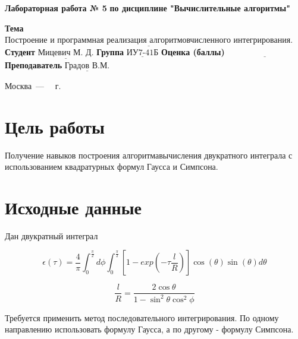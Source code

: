 \documentclass[a4paper,12pt]{article}
\begin{document}
\begin{center}
	\noindent\begin{minipage}{1.3\textwidth}\centering
	\Large\textbf{  Лабораторная работа № 5}\newline
	\textbf{по дисциплине "Вычислительные алгоритмы"}\newline\newline\newline
	\end{minipage}
\end{center}

\noindent\textbf{Тема} $\underline{\text{Построение и программная реализация алгоритмовчисленного интегрирования.}}$\newline\newline
\noindent\textbf{Студент} $\underline{\text{Мицевич М. Д.}}$\newline\newline
\noindent\textbf{Группа} $\underline{\text{ИУ7-41Б}}$\newline\newline
\noindent\textbf{Оценка (баллы)} $\underline{\text{~~~~~~~~~~~~~~~~~~~~~~~~~~~}}$\newline\newline
\noindent\textbf{Преподаватель} $\underline{\text{Градов В.М.}}$\newline

\begin{center}
	\vfill
	Москва~---~\the\year
~г.
\end{center}
\clearpage

\section{Цель работы}

\noindent Получение  навыков  построения  алгоритмавычисления  двукратного интеграла с использованием квадратурных формул Гаусса и Симпсона.

\section{Исходные данные}
\noindent Дан двукратный интеграл

\[\epsilon(\tau) = \frac{4}{\pi} \int_{0}^{\frac{\pi}{2}}d\phi\int_{0}^{\frac{\pi}{2}}[1 - 
exp(-\tau\frac{l}{R})]\cos(\theta)\sin(\theta)d\theta\]

\[\frac{l}{R} = \frac{2\cos{\theta}}{1 - \sin^2{\theta}\cos^2{\phi}}\]

\noindent Требуется применить  метод  последовательного  интегрирования.    По  одному  направлению использовать формулу Гаусса, а по другому - формулу Симпсона.
\end{document}
